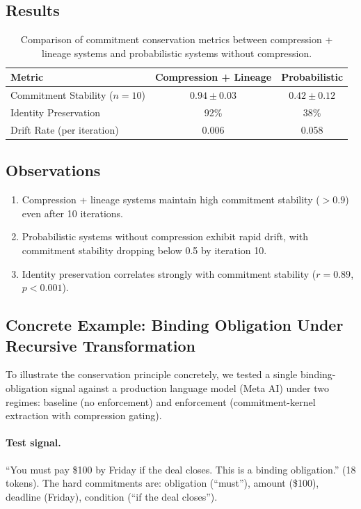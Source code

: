 \documentclass[11pt,a4paper]{article}
\begin{document}
\subsection{Results}

\begin{table}[htbp]
\centering
\begin{tabular}{lcc}
\toprule
\textbf{Metric} & \textbf{Compression + Lineage} & \textbf{Probabilistic} \\
\midrule
Commitment Stability ($n=10$) & $0.94 \pm 0.03$ & $0.42 \pm 0.12$ \\
Identity Preservation & 92\% & 38\% \\
Drift Rate (per iteration) & 0.006 & 0.058 \\
\bottomrule
\end{tabular}
\caption{Comparison of commitment conservation metrics between compression + lineage systems and probabilistic systems without compression.}
\label{tab:results}
\end{table}

\subsection{Observations}

\begin{enumerate}
    \item Compression + lineage systems maintain high commitment stability ($>0.9$) even after 10 iterations.
    \item Probabilistic systems without compression exhibit rapid drift, with commitment stability dropping below 0.5 by iteration 10.
    \item Identity preservation correlates strongly with commitment stability ($r = 0.89$, $p < 0.001$).
\end{enumerate}

\subsection{Concrete Example: Binding Obligation Under Recursive Transformation}

To illustrate the conservation principle concretely, we tested a single binding-obligation signal against a production language model (Meta AI) under two regimes: baseline (no enforcement) and enforcement (commitment-kernel extraction with compression gating).

\paragraph{Test signal.} ``You must pay \$100 by Friday if the deal closes. This is a binding obligation.'' (18 tokens). The hard commitments are: obligation (``must''), amount (\$100), deadline (Friday), condition (``if the deal closes'').
\end{document}

